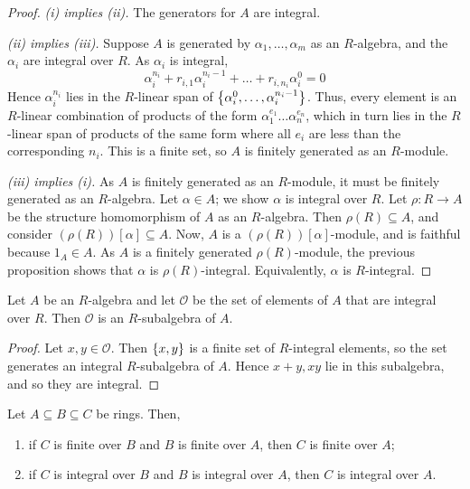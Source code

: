 \begin{proof}
    \emph{(i) implies (ii).}
    The generators for \( A \) are integral.

    \emph{(ii) implies (iii).}
    Suppose \( A \) is generated by \( \alpha_1, \dots, \alpha_m \) as an \( R \)-algebra, and the \( \alpha_i \) are integral over \( R \).
    As \( \alpha_i \) is integral,
    \[ \alpha_i^{n_i} + r_{i,1} \alpha_i^{n_i - 1} + \dots + r_{i,n_i} \alpha_i^0 = 0 \]
    Hence \( \alpha_i^{n_i} \) lies in the \( R \)-linear span of \( \qty{\alpha_i^0, \dots, \alpha_i^{n_i - 1}} \).
    Thus, every element is an \( R \)-linear combination of products of the form \( \alpha_1^{e_1} \dots \alpha_n^{e_n} \), which in turn lies in the \( R \)-linear span of products of the same form where all \( e_i \) are less than the corresponding \( n_i \).
    This is a finite set, so \( A \) is finitely generated as an \( R \)-module.

    \emph{(iii) implies (i).}
    As \( A \) is finitely generated as an \( R \)-module, it must be finitely generated as an \( R \)-algebra.
    Let \( \alpha \in A \); we show \( \alpha \) is integral over \( R \).
    Let \( \rho : R \to A \) be the structure homomorphism of \( A \) as an \( R \)-algebra.
    Then \( \rho(R) \subseteq A \), and consider \( (\rho(R))[\alpha] \subseteq A \).
    Now, \( A \) is a \( (\rho(R))[\alpha] \)-module, and is faithful because \( 1_A \in A \).
    As \( A \) is a finitely generated \( \rho(R) \)-module, the previous proposition shows that \( \alpha \) is \( \rho(R) \)-integral.
    Equivalently, \( \alpha \) is \( R \)-integral.
\end{proof}
\begin{proposition}
    Let \( A \) be an \( R \)-algebra and let \( \mathcal O \) be the set of elements of \( A \) that are integral over \( R \).
    Then \( \mathcal O \) is an \( R \)-subalgebra of \( A \).
\end{proposition}
\begin{proof}
    Let \( x, y \in \mathcal O \).
    Then \( \qty{x, y} \) is a finite set of \( R \)-integral elements, so the set generates an integral \( R \)-subalgebra of \( A \).
    Hence \( x + y, xy \) lie in this subalgebra, and so they are integral.
\end{proof}
\begin{proposition}
    Let \( A \subseteq B \subseteq C \) be rings.
    Then,
    \begin{enumerate}
        \item if \( C \) is finite over \( B \) and \( B \) is finite over \( A \), then \( C \) is finite over \( A \);
        \item if \( C \) is integral over \( B \) and \( B \) is integral over \( A \), then \( C \) is integral over \( A \).
    \end{enumerate}
\end{proposition}

